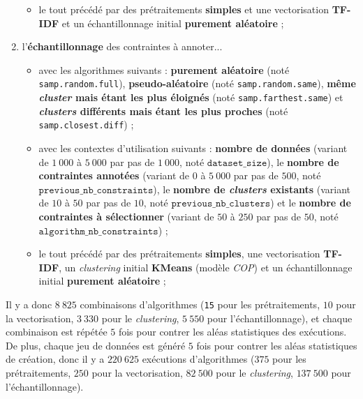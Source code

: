 \begin{enumerate}
\begin{itemize}
						\item le tout précédé par des prétraitements \textbf{simples} et une vectorisation \textbf{TF-IDF} et un échantillonnage initial \textbf{purement aléatoire} ;
					\end{itemize}
				\item l'\textbf{échantillonnage} des contraintes à annoter...
					\begin{itemize}
						\item avec les algorithmes suivants : \textbf{purement aléatoire} (noté \texttt{samp.random.full}), \textbf{pseudo-aléatoire} (noté \texttt{samp.random.same}), \textbf{même \textit{cluster} mais étant les plus éloignés} (noté \texttt{samp.farthest.same}) et \textbf{\textit{clusters} différents mais étant les plus proches} (noté \texttt{samp.closest.diff}) ;
						\item avec les contextes d'utilisation suivants : \textbf{nombre de données} (variant de $1~000$ à $5~000$ par pas de $1~000$, noté $\texttt{dataset\_size}$), le \textbf{nombre de contraintes annotées} (variant de $0$ à $5~000$ par pas de $500$, noté $\texttt{previous\_nb\_constraints}$), le \textbf{nombre de \textit{\textit{clusters}} existants} (variant de $10$ à $50$ par pas de $10$, noté $\texttt{previous\_nb\_clusters}$) et le \textbf{nombre de contraintes à sélectionner} (variant de $50$ à $250$ par pas de $50$, noté $\texttt{algorithm\_nb\_constraints}$) ;
						\item le tout précédé par des prétraitements \textbf{simples}, une vectorisation \textbf{TF-IDF}, un \textit{clustering} initial \textbf{KMeans} (modèle \textit{COP}) et un échantillonnage initial \textbf{purement aléatoire} ;
					\end{itemize}
			\end{enumerate}
			
			Il y a donc $8~825$ combinaisons d'algorithmes (\texttt{15} pour les prétraitements, $10$ pour la vectorisation, $3~330$ pour le \textit{clustering}, $5~550$ pour l'échantillonnage), et chaque combinaison est répétée $5$ fois pour contrer les aléas statistiques des exécutions.
			De plus, chaque jeu de données est généré $5$ fois pour contrer les aléas statistiques de création, donc il y a $220~625$ exécutions d'algorithmes ($375$ pour les prétraitements, $250$ pour la vectorisation, $82~500$ pour le \textit{clustering}, $137~500$ pour l'échantillonnage).
			
